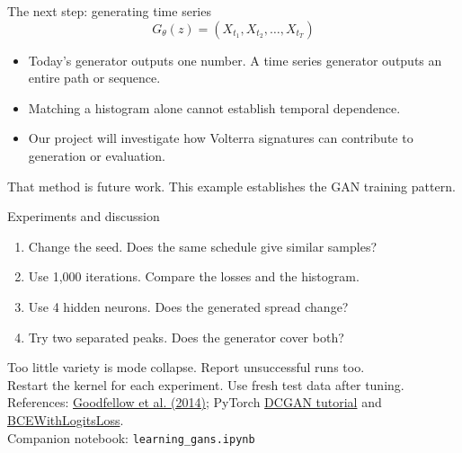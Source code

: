 \documentclass[aspectratio=169,11pt]{beamer}
\begin{document}
\begin{frame}{The next step: generating time series}
\large
\[G_\theta(z)=(X_{t_1},X_{t_2},\ldots,X_{t_T})\]
\normalsize
\begin{itemize}\setlength\itemsep{4mm}
\item Today's generator outputs one number. A time series generator outputs an entire path or sequence.
\item Matching a histogram alone cannot establish temporal dependence.
\item Our project will investigate how Volterra signatures can contribute to generation or evaluation.
\end{itemize}
\vspace{4mm}
That method is future work. This example establishes the GAN training pattern.
\end{frame}

\begin{frame}{Experiments and discussion}
\begin{enumerate}\setlength\itemsep{3mm}
\item Change the seed. Does the same schedule give similar samples?
\item Use 1,000 iterations. Compare the losses and the histogram.
\item Use 4 hidden neurons. Does the generated spread change?
\item Try two separated peaks. Does the generator cover both?
\end{enumerate}
\vspace{4mm}
Too little variety is \alert{mode collapse}. Report unsuccessful runs too.\\[2mm]
Restart the kernel for each experiment. Use fresh test data after tuning.
\vfill
\tiny References: \href{https://arxiv.org/abs/1406.2661}{Goodfellow et al. (2014)};
PyTorch \href{https://docs.pytorch.org/tutorials/beginner/dcgan_faces_tutorial.html}{DCGAN tutorial} and
\href{https://docs.pytorch.org/docs/stable/generated/torch.nn.BCEWithLogitsLoss.html}{BCEWithLogitsLoss}.\\[2mm]
\small Companion notebook: \texttt{learning\_gans.ipynb}
\end{frame}
\end{document}
